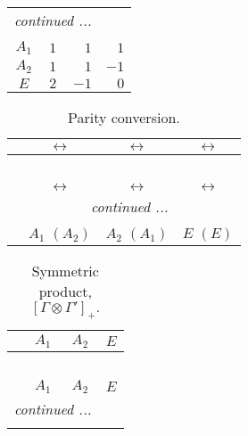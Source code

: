 \documentclass[fleqn,10pt,landscape]{article}
\begin{document}
\begin{itemize}
\begin{center}
\begin{longtable}{c|rrr}
 \hline \hline
\multicolumn{3}{r}{\footnotesize\it continued ...} \\ \endfoot

 \hline \hline
\multicolumn{3}{r}{} \\ \endlastfoot

$ A_{1} $ & $ 1 $ & $ 1 $ & $ 1 $ \\
$ A_{2} $ & $ 1 $ & $ 1 $ & $ -1 $ \\
$ E $ & $ 2 $ & $ -1 $ & $ 0 $ \\
\end{longtable}
\end{center}
\begin{center}
\renewcommand{\arraystretch}{1.0}
\begin{longtable}{cccc}
\caption{Parity conversion.}
 \\
 \hline \hline
 & $\leftrightarrow$ & $\leftrightarrow$ & $\leftrightarrow$ \\ \hline \endfirsthead

\multicolumn{3}{l}{\tablename\ \thetable{}} \\
 \hline \hline
 & $\leftrightarrow$ & $\leftrightarrow$ & $\leftrightarrow$ \\ \hline \endhead

 \hline \hline
\multicolumn{3}{r}{\footnotesize\it continued ...} \\ \endfoot

 \hline \hline
\multicolumn{3}{r}{} \\ \endlastfoot

 & $ A_{1}\,\,(A_{2}) $ & $ A_{2}\,\,(A_{1}) $ & $ E\,\,(E) $ \\
\end{longtable}
\end{center}
\begin{center}
\renewcommand{\arraystretch}{1.0}
\begin{longtable}{c|ccc}
\caption{Symmetric product, $[\Gamma\otimes\Gamma']_+.$}
 \\
 \hline \hline
 & $ A_{1} $ & $ A_{2} $ & $ E $ \\ \hline \endfirsthead

\multicolumn{3}{l}{\tablename\ \thetable{}} \\
 \hline \hline
 & $ A_{1} $ & $ A_{2} $ & $ E $ \\ \hline \endhead

 \hline \hline
\multicolumn{3}{r}{\footnotesize\it continued ...} \\ \endfoot


\end{longtable}
\end{center}
\end{itemize}
\end{document}
